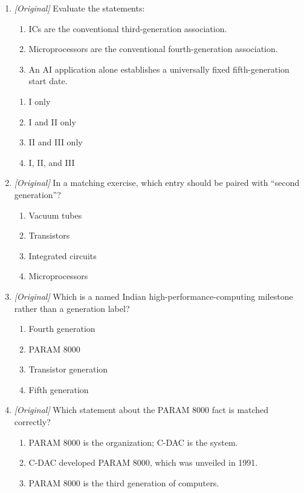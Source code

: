 \documentclass[11pt]{article}
\begin{document}
\begin{enumerate}[label=\textbf{Q\arabic*.}, leftmargin=*]
\begin{enumerate}[label=\Alph*.]
  \end{enumerate}
\item \textit{[Original]} Evaluate the statements:
  \begin{enumerate}[label=\Roman*.]
    \item ICs are the conventional third-generation association.
    \item Microprocessors are the conventional fourth-generation association.
    \item An AI application alone establishes a universally fixed
      fifth-generation start date.
  \end{enumerate}
  \begin{enumerate}[label=\Alph*.]
    \item I only
    \item I and II only
    \item II and III only
    \item I, II, and III
  \end{enumerate}
\item \textit{[Original]} In a matching exercise, which entry should be
  paired with ``second generation''?
  \begin{enumerate}[label=\Alph*.]
    \item Vacuum tubes
    \item Transistors
    \item Integrated circuits
    \item Microprocessors
  \end{enumerate}
\item \textit{[Original]} Which is a named Indian high-performance-computing
  milestone rather than a generation label?
  \begin{enumerate}[label=\Alph*.]
    \item Fourth generation
    \item PARAM 8000
    \item Transistor generation
    \item Fifth generation
  \end{enumerate}
\item \textit{[Original]} Which statement about the PARAM 8000 fact is
  matched correctly?
  \begin{enumerate}[label=\Alph*.]
    \item PARAM 8000 is the organization; C-DAC is the system.
    \item C-DAC developed PARAM 8000, which was unveiled in 1991.
    \item PARAM 8000 is the third generation of computers.

\end{enumerate}
\end{enumerate}
\end{document}
